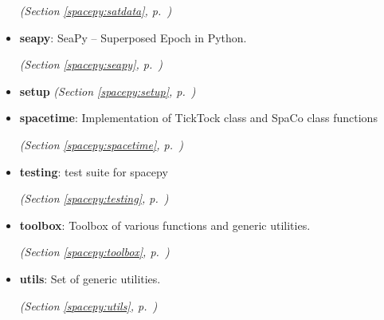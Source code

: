 \begin{itemize}
  \textit{(Section \ref{spacepy:satdata}, p.~\pageref{spacepy:satdata})}

\item \textbf{seapy}: SeaPy -- Superposed Epoch in Python.



  \textit{(Section \ref{spacepy:seapy}, p.~\pageref{spacepy:seapy})}

\item \textbf{setup}
  \textit{(Section \ref{spacepy:setup}, p.~\pageref{spacepy:setup})}

\item \textbf{spacetime}: Implementation of TickTock class and SpaCo class functions



  \textit{(Section \ref{spacepy:spacetime}, p.~\pageref{spacepy:spacetime})}

\item \textbf{testing}: test suite for spacepy



  \textit{(Section \ref{spacepy:testing}, p.~\pageref{spacepy:testing})}

\item \textbf{toolbox}: Toolbox of various functions and generic utilities.



  \textit{(Section \ref{spacepy:toolbox}, p.~\pageref{spacepy:toolbox})}

\item \textbf{utils}: Set of generic utilities.



  \textit{(Section \ref{spacepy:utils}, p.~\pageref{spacepy:utils})}

\end{itemize}

